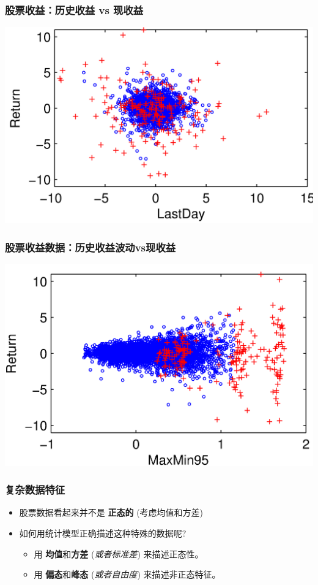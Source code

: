 \documentclass[11pt]{beamer}
\begin{document}
\begin{frame}
  \frametitle{股票收益：历史收益 vs 现收益}
    \centering \includegraphics[height=0.8\textheight]{returnlastday}
\end{frame}

\begin{frame}
  \frametitle{股票收益数据：历史收益\textbf{波动}vs现收益}
  \centering \includegraphics[height=0.8\textheight]{returnminmax}
\end{frame}


\begin{frame}
  \frametitle{复杂数据特征}
  \begin{itemize}
  \item 股票数据看起来并不是 \textbf{正态的} (考虑均值和方差)
  \item 如何用统计模型正确描述这种特殊的数据呢?

    \begin{itemize}
    \item 用 \textbf{均值}和\textbf{方差} (\emph{或者标准差}) 来描述正态性。
    \item 用 \textbf{偏态}和\textbf{峰态} (\emph{或者自由度}) 来描述非正态特征。
    \end{itemize}

  \end{itemize}
\end{frame}
\end{document}
